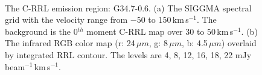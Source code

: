 \documentclass[manuscript]{aastex61}
\newcommand{\kms}{\,km\,s$^{-1}$}
\newcommand{\um}{\mu m}
\begin{document}
\begin{figure}[H]
	\centering
	\\ 
	\caption{The C-RRL emission region: G34.7-0.6.
	(a) The SIGGMA spectral grid with the velocity range from $-50$ to 150\kms.
	The background is the 0$^{th}$ moment C-RRL map over $30$ to $50$\kms.
	(b) The infrared RGB color map (r: 24\,$\um$, g: 8\,$\um$, b: 4.5\,$\um$) overlaid by integrated RRL contour.
	The levels are 4, 8, 12, 16, 18, 22 mJy\,beam$^{-1}$\kms.}
	\label{fig_crrl-g347}
\end{figure}
\end{document}
